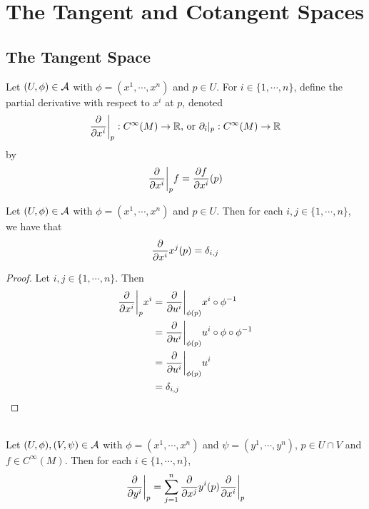 \documentclass{book}
\begin{document}
	\newpage
	\chapter{The Tangent and Cotangent Spaces}
	\section{The Tangent Space}


	\begin{defn}
		Let $(U, \phi) \in \mathcal{A}$ with $\phi = (x^1, \cdots, x^n)$ and $p \in U$. For $i \in \{1, \cdots, n\}$, define the partial derivative with respect to $x^i$ at $p$, denoted $$\frac{\partial}{\partial x^i} \bigg|_p: C^{\infty}(M) \rightarrow \mathbb{R}  \text{, or } \partial_i|_p: C^{\infty}(M) \rightarrow \mathbb{R} $$ by $$ \frac{\partial}{\partial x^i} \bigg |_p  f =  \frac{\partial f}{\partial x^i}(p) $$
	\end{defn}

	\begin{ex}
		Let $(U, \phi) \in \mathcal{A}$ with $\phi = (x^1, \cdots, x^n)$ and $p \in U$. Then for each $i,j \in \{1, \cdots, n\}$, we have that $${\frac{\partial}{\partial x^i}{x^j}}(p) = \delta_{i,j}$$
	\end{ex}

	\begin{proof}
		Let $i,j \in \{1, \cdots, n\}$. Then 
		\begin{align*}
			\frac{\partial}{\partial x^i} \bigg|_p x^i 
			&=  \frac{\partial}{\partial u^i} \bigg|_{\phi(p)} x^i \circ \phi^{-1} \\
			&= \frac{\partial}{\partial u^i} \bigg|_{\phi(p)} u^i \circ \phi \circ \phi^{-1} \\
			&= \frac{\partial}{\partial u^i} \bigg|_{\phi(p)} u^i  \\
			&= \delta_{i,j}
		\end{align*}
	\end{proof}

	\begin{ex} \\
		Let $(U, \phi), (V, \psi) \in \mathcal{A}$ with $\phi = (x^1, \cdots, x^n)$ and $\psi = (y^1, \cdots, y^n)$, $p \in U \cap V$ and $f \in C^{\infty}(M)$. Then for each $i \in \{1, \cdots, n\}$, 
		 $$\frac{\partial}{\partial y^i} \bigg|_p = \sum_{j =1}^n {\frac{\partial}{\partial x^j}{y^i}}(p) \frac{\partial}{\partial x^i} \bigg|_p    $$
	\end{ex}
\end{document}
